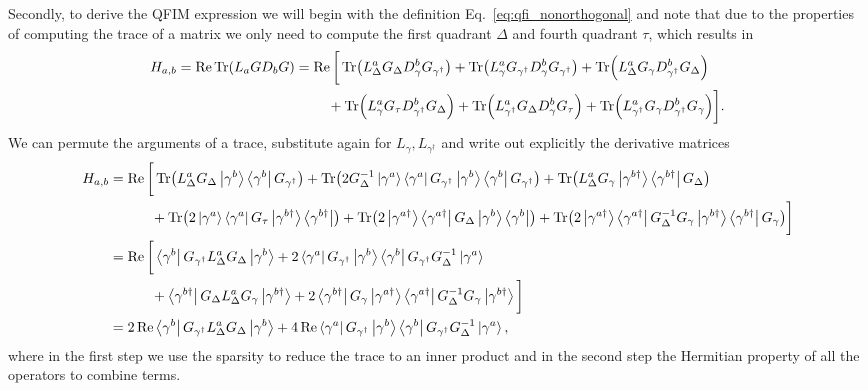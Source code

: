 \documentclass[reprint,amsmath,amssymb,aps,prl,floatfix,groupedaddress,superscriptaddress]{revtex4-2}
\begin{document}
Secondly, to derive the QFIM expression we will begin with the definition Eq.~\eqref{eq:qfi_nonorthogonal} and note that due to the properties of computing the trace of a matrix we only need to compute the first quadrant $\Delta$ and fourth quadrant $\tau$, which results in
\begin{align}
    H_{a,b} = \Re \Tr (L_a G D_b G) &= \Re \bigg[\Tr (L^a_\Delta G_\Delta D^b_\gamma G_{\gamma^\dagger}) + \Tr (L^a_\gamma G_{\gamma^\dagger} D^b_\gamma G_{\gamma^\dagger}) + \Tr (L^a_{\Delta} G_{\gamma} D^b_{\gamma^\dagger} G_\Delta) \nonumber \\ &\quad\quad\ +
    \Tr (L^a_{\gamma} G_\tau D^b_{\gamma^\dagger} G_\Delta)
    + \Tr (L^a_{\gamma^\dagger} G_\Delta D^b_{\gamma} G_\tau)
    + \Tr (L^a_{\gamma^\dagger} G_{\gamma} D^b_{\gamma^\dagger} G_{\gamma}) \bigg].
\end{align}
We can permute the arguments of a trace, substitute again for $L_\gamma, L_{\gamma^\dagger}$ and write out explicitly the derivative matrices
\begin{align}
    H_{a,b} &= \Re \bigg[
     \Tr (L^a_\Delta G_\Delta \ket{\gamma^b}\bra{\gamma^b} G_{\gamma^\dagger})
    +  \Tr (2 G^{-1}_\Delta\ket{\gamma^{a}}\bra{\gamma^{a}} G_{\gamma^\dagger} \ket{\gamma^b}\bra{\gamma^b} G_{\gamma^\dagger})
    +  \Tr (L^a_{\Delta} G_{\gamma} \ket{\gamma^{b\dagger}}\bra{\gamma^{b\dagger}} G_\Delta) \nonumber  \\
    &\quad\qquad + \Tr (2 \ket{\gamma^a}\bra{\gamma^a} G_\tau \ket{\gamma^{b\dagger}}\bra{\gamma^{b\dagger}})
    +  \Tr (2\ket{\gamma^{a\dagger}}\bra{\gamma^{a\dagger}} G_\Delta \ket{\gamma^b}\bra{\gamma^b})
    +  \Tr (2\ket{\gamma^{a\dagger}}\bra{\gamma^{a\dagger}}G^{-1}_\Delta G_{\gamma} \ket{\gamma^{b\dagger}}\bra{\gamma^{b\dagger}} G_{\gamma})
 \bigg] \nonumber \\
    &= \Re \bigg[
    \bra{\gamma^b} G_{\gamma^\dagger} L^a_\Delta G_\Delta\ket{\gamma^b}
    +  2 \bra{\gamma^{a}}G_{\gamma^\dagger}\ket{\gamma^b} \bra{\gamma^b} G_{\gamma^\dagger} G^{-1}_\Delta  \ket{\gamma^{a}}
\nonumber    \\ & \quad\qquad+  \bra{\gamma^{b\dagger}} G_\Delta L^a_{\Delta} G_{\gamma} \ket{\gamma^{b\dagger}}  + 2\bra{\gamma^{b\dagger}} G_{\gamma} \ket{\gamma^{a\dagger}}\bra{\gamma^{a\dagger}}G^{-1}_\Delta G_{\gamma}\ket{\gamma^{b\dagger}} \bigg]\nonumber \\
    &= 2\Re \bra{\gamma^b} G_{\gamma^\dagger} L^a_\Delta G_\Delta \ket{\gamma^b}
    + 4 \Re \bra{\gamma^a}G_{\gamma^\dagger}\ket{\gamma^b}\bra{\gamma^b}G_{\gamma^\dagger} G^{-1}_\Delta\ket{\gamma^a},
\end{align}
where in the first step we use the sparsity to reduce the trace to an inner product and in the second step the Hermitian property of all the operators to combine terms.
\end{document}
